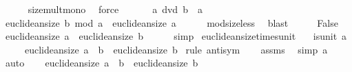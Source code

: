 \begin{isabellebody}
\ \ \ \ \isamarkupfalse%
\ size{\isacharunderscore}{\kern0pt}mult{\isacharunderscore}{\kern0pt}mono\ \isamarkupfalse%
\ force\isanewline
\ \ \isamarkupfalse%
\ \isamarkupfalse%
\ {\isacartoucheopen}{\isasymnot}\ a\ dvd\ b{\isacartoucheclose}\ \ {\isacartoucheopen}a\ {\isasymnoteq}\ {}{\isacartoucheclose}\isanewline
\ \ \isamarkupfalse%
\ {\isachardoublequoteopen}euclidean{\isacharunderscore}{\kern0pt}size\ {\isacharparenleft}{\kern0pt}b\ mod\ a{\isacharparenright}{\kern0pt}\ {\isacharless}{\kern0pt}\ euclidean{\isacharunderscore}{\kern0pt}size\ a{\isachardoublequoteclose}\isanewline
\ \ \ \ \isamarkupfalse%
\ mod{\isacharunderscore}{\kern0pt}size{\isacharunderscore}{\kern0pt}less\ \isamarkupfalse%
\ blast\isanewline
\ \ \isamarkupfalse%
\ \isamarkupfalse%
\ False\ \isamarkupfalse%
\ {\isacartoucheopen}euclidean{\isacharunderscore}{\kern0pt}size\ a\ {\isacharequal}{\kern0pt}\ euclidean{\isacharunderscore}{\kern0pt}size\ b{\isacartoucheclose}\isanewline
\ \ \ \ \isamarkupfalse%
\ simp\isanewline
{}\isamarkupfalse%
%
\endisatagproof
{\isafoldproof}%
%
\isadelimproof
\isanewline
%
\endisadelimproof
\isanewline
{}\isamarkupfalse%
\ euclidean{\isacharunderscore}{\kern0pt}size{\isacharunderscore}{\kern0pt}times{\isacharunderscore}{\kern0pt}unit{\isacharcolon}{\kern0pt}\isanewline
\ \ \ {\isachardoublequoteopen}is{\isacharunderscore}{\kern0pt}unit\ a{\isachardoublequoteclose}\isanewline
\ \ \ \ \ {\isachardoublequoteopen}euclidean{\isacharunderscore}{\kern0pt}size\ {\isacharparenleft}{\kern0pt}a\ {\isacharasterisk}{\kern0pt}\ b{\isacharparenright}{\kern0pt}\ {\isacharequal}{\kern0pt}\ euclidean{\isacharunderscore}{\kern0pt}size\ b{\isachardoublequoteclose}\isanewline
%
\isadelimproof
%
\endisadelimproof
%
\isatagproof
{}\isamarkupfalse%
\ {\isacharparenleft}{\kern0pt}rule\ antisym{\isacharparenright}{\kern0pt}\isanewline
\ \ \isamarkupfalse%
\ assms\ \isamarkupfalse%
\ {\isacharbrackleft}{\kern0pt}simp{\isacharbrackright}{\kern0pt}{\isacharcolon}{\kern0pt}\ {\isachardoublequoteopen}a\ {\isasymnoteq}\ {}{\isachardoublequoteclose}\ \isamarkupfalse%
\ auto\isanewline
\ \ \isamarkupfalse%
\ {\isachardoublequoteopen}euclidean{\isacharunderscore}{\kern0pt}size\ {\isacharparenleft}{\kern0pt}a\ {\isacharasterisk}{\kern0pt}\ b{\isacharparenright}{\kern0pt}\ {\isasymge}\ euclidean{\isacharunderscore}{\kern0pt}size\ b{\isachardoublequoteclose}\ \isamarkupfalse%

\end{isabellebody}
